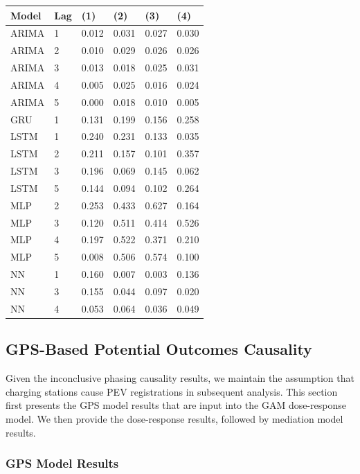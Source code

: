 \documentclass[
  letterpaper,
  DIV=11,
  numbers=noendperiod]{scrartcl}
\begin{document}
\hypertarget{tab-phasing-tests}{}
\begin{longtable}[]{@{}llllll@{}}
\toprule()
Model & Lag & (1) & (2) & (3) & (4) \\
\midrule()
\endhead
ARIMA & 1 & 0.012 & 0.031 & 0.027 & 0.030 \\
ARIMA & 2 & 0.010 & 0.029 & 0.026 & 0.026 \\
ARIMA & 3 & 0.013 & 0.018 & 0.025 & 0.031 \\
ARIMA & 4 & 0.005 & 0.025 & 0.016 & 0.024 \\
ARIMA & 5 & 0.000 & 0.018 & 0.010 & 0.005 \\
GRU & 1 & 0.131 & 0.199 & 0.156 & 0.258 \\
LSTM & 1 & 0.240 & 0.231 & 0.133 & 0.035 \\
LSTM & 2 & 0.211 & 0.157 & 0.101 & 0.357 \\
LSTM & 3 & 0.196 & 0.069 & 0.145 & 0.062 \\
LSTM & 5 & 0.144 & 0.094 & 0.102 & 0.264 \\
MLP & 2 & 0.253 & 0.433 & 0.627 & 0.164 \\
MLP & 3 & 0.120 & 0.511 & 0.414 & 0.526 \\
MLP & 4 & 0.197 & 0.522 & 0.371 & 0.210 \\
MLP & 5 & 0.008 & 0.506 & 0.574 & 0.100 \\
NN & 1 & 0.160 & 0.007 & 0.003 & 0.136 \\
NN & 3 & 0.155 & 0.044 & 0.097 & 0.020 \\
NN & 4 & 0.053 & 0.064 & 0.036 & 0.049 \\
\bottomrule()
\end{longtable}

\hypertarget{gps-based-potential-outcomes-causality}{%
\subsection{GPS-Based Potential Outcomes
Causality}\label{gps-based-potential-outcomes-causality}}

Given the inconclusive phasing causality results, we maintain the
assumption that charging stations cause PEV registrations in subsequent
analysis. This section first presents the GPS model results that are
input into the GAM dose-response model. We then provide the
dose-response results, followed by mediation model results.

\hypertarget{gps-model-results}{%
\subsubsection{GPS Model Results}\label{gps-model-results}}
\end{document}
